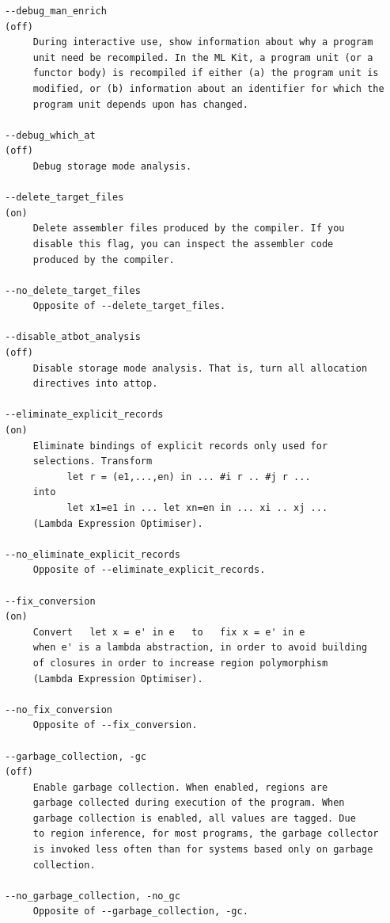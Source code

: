 \documentclass[12pt]{book}
\begin{document}
{\begin{verbatim}
--debug_man_enrich                                                  (off)
     During interactive use, show information about why a program
     unit need be recompiled. In the ML Kit, a program unit (or a
     functor body) is recompiled if either (a) the program unit is
     modified, or (b) information about an identifier for which the
     program unit depends upon has changed.

--debug_which_at                                                    (off)
     Debug storage mode analysis.

--delete_target_files                                                (on)
     Delete assembler files produced by the compiler. If you
     disable this flag, you can inspect the assembler code
     produced by the compiler.

--no_delete_target_files
     Opposite of --delete_target_files.

--disable_atbot_analysis                                            (off)
     Disable storage mode analysis. That is, turn all allocation
     directives into attop.

--eliminate_explicit_records                                         (on)
     Eliminate bindings of explicit records only used for
     selections. Transform
           let r = (e1,...,en) in ... #i r .. #j r ...
     into
           let x1=e1 in ... let xn=en in ... xi .. xj ...
     (Lambda Expression Optimiser).

--no_eliminate_explicit_records
     Opposite of --eliminate_explicit_records.

--fix_conversion                                                     (on)
     Convert   let x = e' in e   to   fix x = e' in e
     when e' is a lambda abstraction, in order to avoid building
     of closures in order to increase region polymorphism
     (Lambda Expression Optimiser).

--no_fix_conversion
     Opposite of --fix_conversion.

--garbage_collection, -gc                                           (off)
     Enable garbage collection. When enabled, regions are
     garbage collected during execution of the program. When
     garbage collection is enabled, all values are tagged. Due
     to region inference, for most programs, the garbage collector
     is invoked less often than for systems based only on garbage
     collection.

--no_garbage_collection, -no_gc
     Opposite of --garbage_collection, -gc.


\end{verbatim}}
\end{document}
